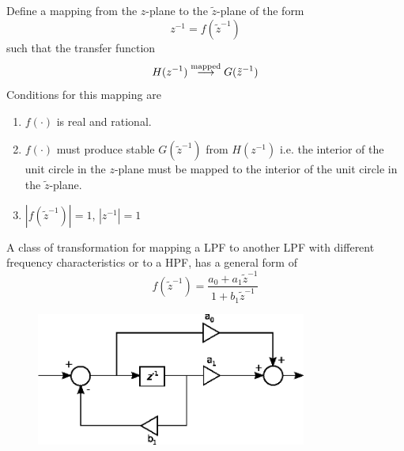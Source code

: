 \documentclass [12pt]{article}   %
\begin{document}
\medskip
Define a mapping from the $z$-plane to the $\tilde{z}$-plane of the form
\begin{equation}
	z^{-1}=f(\tilde{z}^{-1})
\end{equation}
such that the transfer function
\begin{equation}
	H(z^{-1}) \overset{\textnormal{mapped}}{\longrightarrow} G(\tilde{z}^{-1})
\end{equation}
Conditions for this mapping are
\begin{enumerate}
	\item $f(\cdot)$ is real and rational.
	\item $f(\cdot)$ must produce stable $G(\tilde{z}^{-1})$ from $H(z^{-1})$ i.e. the interior of the unit circle in the $z$-plane must be mapped to the interior of the unit circle in the $\tilde{z}$-plane. 
	\item $|f(\tilde{z}^{-1})| = 1$, $|z^{-1}| = 1$
\end{enumerate}
A class of transformation for mapping a LPF to another LPF with different frequency characteristics or to a HPF, has a general form of
\begin{equation}
	f(\tilde{z}^{-1}) = \frac{a_0+a_1\tilde{z}^{-1}}{1+b_1 \tilde{z}^{-1}}
\end{equation}
\begin{figure}[H]
	\centering
	\includegraphics[width=3.5in]{transformation.eps}
	\label{fig:transformation}
\end{figure}
\end{document}
